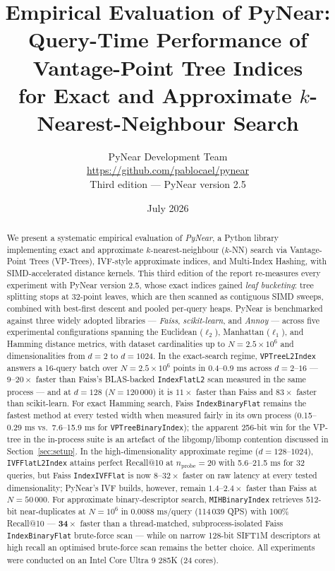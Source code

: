 \documentclass[11pt,a4paper]{article}
\title{\textbf{Empirical Evaluation of PyNear:}\\[4pt]
       \large Query-Time Performance of Vantage-Point Tree Indices\\
       for Exact and Approximate $k$-Nearest-Neighbour Search}
\author{PyNear Development Team \\[4pt]
        \small \url{https://github.com/pablocael/pynear} \\[2pt]
        \small Third edition — PyNear version 2.5}
\date{July 2026}
\begin{document}
\maketitle
\thispagestyle{empty}

\begin{abstract}
We present a systematic empirical evaluation of \emph{PyNear}, a Python
library implementing exact and approximate $k$-nearest-neighbour
($k$-NN) search via Vantage-Point Trees (VP-Trees), IVF-style approximate
indices, and Multi-Index Hashing, with SIMD-accelerated distance kernels.
This third edition of the report re-measures every experiment with
PyNear version 2.5, whose exact indices gained \emph{leaf bucketing}:
tree splitting stops at 32-point leaves, which are then scanned as
contiguous SIMD sweeps, combined with best-first descent and pooled
per-query heaps.
PyNear is benchmarked against three widely adopted libraries —
\emph{Faiss}, \emph{scikit-learn}, and \emph{Annoy} — across five
experimental configurations spanning the Euclidean ($\ell_2$),
Manhattan ($\ell_1$), and Hamming distance metrics, with dataset
cardinalities up to $N = 2.5 \times 10^6$ and dimensionalities from
$d = 2$ to $d = 1024$.  In the exact-search regime,
\texttt{VPTreeL2Index} answers a 16-query batch over $N = 2.5\times10^6$
points in 0.4--0.9 ms across $d = 2$--$16$ — $9\text{--}20\times$
faster than Faiss's BLAS-backed \texttt{IndexFlatL2} scan measured in the
same process — and at $d = 128$ ($N = 120\,000$) it is $11\times$ faster
than Faiss and $83\times$ faster than scikit-learn.
For exact Hamming search, Faiss \texttt{IndexBinaryFlat} remains the
fastest method at every tested width when measured fairly in its own
process (0.15--0.29 ms vs.\ 7.6--15.9 ms for \texttt{VPTreeBinaryIndex});
the apparent 256-bit win for the VP-tree in the in-process suite is an
artefact of the libgomp/libomp contention discussed in
Section~\ref{sec:setup}.
In the high-dimensionality approximate regime ($d = 128$--$1024$),
\texttt{IVFFlatL2Index} attains perfect Recall@10 at
$n_{\mathrm{probe}} = 20$ with 5.6--21.5 ms for 32 queries, but Faiss
\texttt{IndexIVFFlat} is now $8\text{--}32\times$ faster on raw latency
at every tested dimensionality; PyNear's IVF builds, however, remain
$1.4\text{--}2.4\times$ faster than Faiss at $N = 50\,000$.
For approximate binary-descriptor search, \texttt{MIHBinaryIndex}
retrieves 512-bit near-duplicates at $N = 10^6$ in 0.0088 ms/query
(114\,039 QPS) with 100\% Recall@10 — $\mathbf{34\times}$ faster than a
thread-matched, subprocess-isolated Faiss \texttt{IndexBinaryFlat}
brute-force scan — while on narrow 128-bit SIFT1M descriptors at high
recall an optimised brute-force scan remains the better choice.
All experiments were conducted on an
Intel\textsuperscript{\textregistered}
Core\textsuperscript{\texttrademark} Ultra 9 285K (24 cores).
\end{abstract}
\end{document}
